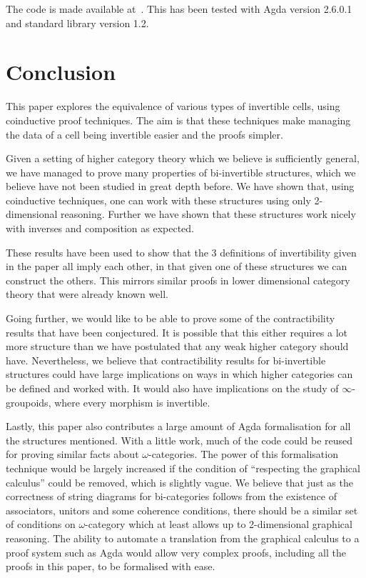 \documentclass{article}
\theoremstyle{definition}
\theoremstyle{remark}
\begin{document}
The code is made available at~\cite{rice_agda}. This has been tested with Agda version 2.6.0.1 and standard library version 1.2.

\section{Conclusion}\label{sec:conclusion}

This paper explores the equivalence of various types of invertible cells, using coinductive proof techniques. The aim is that these techniques make managing the data of a cell being invertible easier and the proofs simpler.

Given a setting of higher category theory which we believe is sufficiently general, we have managed to prove many properties of bi-invertible structures, which we believe have not been studied in great depth before. We have shown that, using coinductive techniques, one can work with these structures using only 2-dimensional reasoning. Further we have shown that these structures work nicely with inverses and composition as expected.

These results have been used to show that the 3 definitions of invertibility given in the paper all imply each other, in that given one of these structures we can construct the others. This mirrors similar proofs in lower dimensional category theory that were already known well.

Going further, we would like to be able to prove some of the contractibility results that have been conjectured. It is possible that this either requires a lot more structure than we have postulated that any weak higher category should have. Nevertheless, we believe that contractibility results for bi-invertible structures could have large implications on ways in which higher categories can be defined and worked with. It would also have implications on the study of \(\infty\)-groupoids, where every morphism is invertible.

Lastly, this paper also contributes a large amount of Agda formalisation for all the structures mentioned. With a little work, much of the code could be reused for proving similar facts about \(\omega\)-categories. The power of this formalisation technique would be largely increased if the condition of ``respecting the graphical calculus'' could be removed, which is slightly vague. We believe that just as the correctness of string diagrams for bi-categories follows from the existence of associators, unitors and some coherence conditions, there should be a similar set of conditions on \(\omega\)-category which at least allows up to 2-dimensional graphical reasoning. The ability to automate a translation from the graphical calculus to a proof system such as Agda would allow very complex proofs, including all the proofs in this paper, to be formalised with ease.

\printbibliography{}
\end{document}
